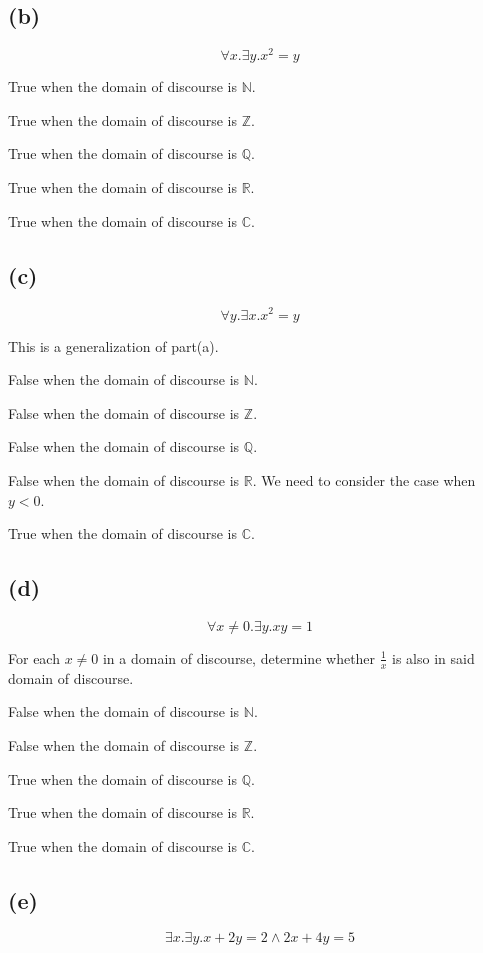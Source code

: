 \documentclass{article}
\begin{document}
\subsection{(b)}
\[
	\forall x. \exists y. x^2 = y
\]

True when the domain of discourse is $\mathbb{N}$.

True when the domain of discourse is $\mathbb{Z}$.

True when the domain of discourse is $\mathbb{Q}$.

True when the domain of discourse is $\mathbb{R}$.

True when the domain of discourse is $\mathbb{C}$.

\subsection{(c)}
\[
	\forall y. \exists x.x^2 = y
\]

This is a generalization of part(a).

False when the domain of discourse is $\mathbb{N}$.

False when the domain of discourse is $\mathbb{Z}$.

False when the domain of discourse is $\mathbb{Q}$.

False when the domain of discourse is $\mathbb{R}$. We need to consider the case when $y < 0$.

True when the domain of discourse is $\mathbb{C}$.

\subsection{(d)}
\[
	\forall x \ne 0. \exists y.xy = 1
\]

For each $x \ne 0$ in a domain of discourse, determine whether $\frac{1}{x}$ is also in said domain of discourse.

False when the domain of discourse is $\mathbb{N}$.

False when the domain of discourse is $\mathbb{Z}$.

True when the domain of discourse is $\mathbb{Q}$.

True when the domain of discourse is $\mathbb{R}$.

True when the domain of discourse is $\mathbb{C}$.

\subsection{(e)}
\[
	\exists x. \exists y.x + 2y = 2 \land 2x + 4y = 5
\]
\end{document}
